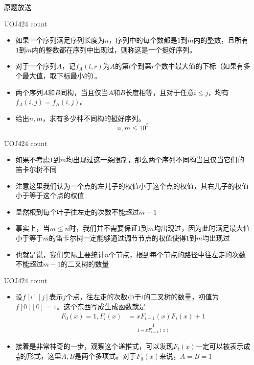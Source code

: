 \documentclass{beamer}
\begin{document}
\begin{frame}{原题放送}
    \begin{block}{UOJ424 count}
        \begin{itemize}
            \item 如果一个序列满足序列长度为$n$，序列中的每个数都是$1$到$m$内的整数，且所有$1$到$m$内的整数都在序列中出现过，则称这是一个挺好序列。
            \item 对于一个序列$A$，记$f_A(l,r)$为$A$的第$l$个到第$r$​个数中最大值的下标（如果有多个最大值，取下标最小的）。
            \item 两个序列$A$和$B$同构，当且仅当$A$和$B$长度相等，且对于任意$i\leq j$，均有$f_A(i,j)=f_B(i,j)$。
            \item 给出$n,m$，求有多少种不同构的挺好序列。
            $$n, m\leq 10^5$$
        \end{itemize}
    \end{block}
\end{frame}

\begin{frame}{UOJ424 count}
    \begin{itemize}
        \item 如果不考虑$1$到$m$均出现过这一条限制，那么两个序列不同构当且仅当它们的笛卡尔树不同 \pause
        \item 注意这里我们认为一个点的左儿子的权值小于这个点的权值，其右儿子的权值小于等于这个点的权值 \pause
        \item 显然根到每个叶子往左走的次数不能超过$m-1$ \pause
        \item 事实上，当$m\leq n$时，我们并不需要保证$1$到$m$均出现过，因为此时满足最大值小于等于$m$的笛卡尔树一定能够通过调节节点的权值使得$1$到$m$均出现过 \pause
        \item 也就是说，我们实际上要统计$n$个节点，根到每个节点的路径中往左走的次数不能超过$m-1$的二叉树的数量
    \end{itemize}
\end{frame}

\begin{frame}{UOJ424 count}
    \begin{itemize}
        \item 设$f[i][j]$表示$j$个点，往左走的次数小于$i$的二叉树的数量，初值为$f[0][0] = 1$。这个东西写成生成函数就是 
        $$\begin{aligned}
            F_0(x) = 1, F_i(x) &= xF_{i - 1}(x)F_i(x) + 1\\
            &= \frac{1}{1 - xF_{i - 1}(x)}
        \end{aligned}$$ \pause
        \item 接着是非常神奇的一步，观察这个递推式，可以发现$F_t(x)$一定可以被表示成$\frac{A}{B}$的形式，这里$A,B$是两个多项式。对于$F_0(x)$来说，$A=B=1$
    \end{itemize}
\end{frame}
\end{document}
